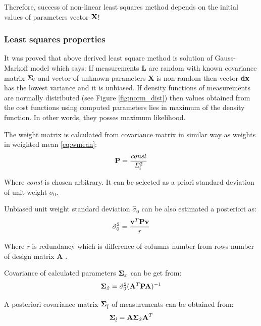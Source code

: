 \documentclass[a4paper,12pt]{article}
\newcommand{\ematr}[1]{%
{\bf #1}%
}
\newcommand{\evect}[1]{%
{\bf #1}%
}
\newcommand{\escal}[1]{%
{\it #1}%
}
\begin{document}
Therefore, success of non-linear least squares method depends on the initial values of parameters vector $\evect{X}$!

\subsubsection{Least squares properties}
\label{sec:lsq_props}
It was proved \cite{mervart2007adjustment} that above derived least square method is solution of Gauss-Markoff model which says:
If measurements \evect{L} are random with known covariance matrix $\ematr{\Sigma}_{l}$  
and vector of unknown parameters \evect{X} is non-random then
vector \evect{dx}  has the lowest variance and it is unbiased. If density functions of measurements are normally 
distributed (see Figure \ref{fig:norm_dist}) then values obtained from the cost functions using  computed parameters lies in maximum of the density
function. In other words, they posses maximum likelihood.

The weight matrix is calculated from covariance matrix in similar way as weights in weighted mean \eqref{eq:wmean}:
\begin{equation}
\ematr{P} = \frac{\escal{const}}{\escal{\Sigma}_{i}^{2}}
\end{equation} 

Where \escal{const} is chosen arbitrary. It can be selected as a priori standard deviation of unit weight $\sigma_{0}$. 


Unbiased unit weight standard deviation $\hat{\sigma}_{0}$ can be also estimated a posteriori as:
\begin{equation}
\escal{\hat{\sigma}}_{0}^{2} = \frac{\evect{v}^{T} \ematr{P}  \evect{v}}{\escal{r}}
\end{equation} 

Where \escal{r} is redundancy which is difference of columns number from rows number of design matrix \ematr{A}.

Covariance of calculated parameters $\ematr{\Sigma}_{x}$ can be get from:
\begin{equation}
\ematr{\Sigma}_{\hat{x}} = \escal{\hat{\sigma}}_{0}^{2} (\ematr{A}^{T} \ematr{P} \ematr{A})^{-1}
\end{equation} 

A posteriori covariance matrix $\ematr{\Sigma}_{\hat{l}}$ of measurements can be obtained from:
\begin{equation}
\ematr{\Sigma}_{\hat{l}} =  \ematr{A} \ematr{\Sigma}_{\hat{x}} \ematr{A}^{T}
\end{equation} 
\end{document}
